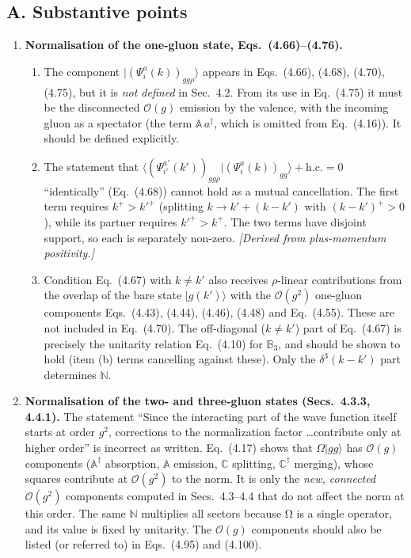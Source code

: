 \documentclass[11pt,a4paper]{article}
\newcommand{\eq}[1]{Eq.~(#1)}
\newcommand{\eqs}[1]{Eqs.~(#1)}
\begin{document}
\subsection*{A. Substantive points}

\begin{enumerate}[label=\textbf{A\arabic*.},leftmargin=26pt,itemsep=6pt]

\item \textbf{Normalisation of the one-gluon state, Eqs.~(4.66)--(4.76).}
\begin{enumerate}[label=(\alph*),itemsep=2pt]
\item The component $|(\Psi^a_i(k))_{gg\rho}\rangle$ appears in \eqs{4.66}, (4.68), (4.70), (4.75), but it is \emph{not defined} in Sec.~4.2. From its use in \eq{4.75} it must be the disconnected $\mathcal O(g)$ emission by the valence, with the incoming gluon as a spectator (the term $\mathbb A\,a^\dagger$, which is omitted from \eq{4.16}). It should be defined explicitly.
\item The statement that $\langle(\Psi^{a'}_{i'}(k'))_{gg\rho}|(\Psi^a_i(k))_{gg}\rangle+\text{h.c.}=0$ ``identically'' (\eq{4.68}) cannot hold as a mutual cancellation. The first term requires $k^+>k'^+$ (splitting $k\to k'+(k-k')$ with $(k-k')^+>0$), while its partner requires $k'^+>k^+$. The two terms have disjoint support, so each is separately non-zero. \emph{[Derived from plus-momentum positivity.]}
\item Condition \eq{4.67} with $k\neq k'$ also receives $\rho$-linear contributions from the overlap of the bare state $|g(k')\rangle$ with the $\mathcal O(g^2)$ one-gluon components \eqs{4.43}, (4.44), (4.46), (4.48) and \eq{4.55}. These are not included in \eq{4.70}. The off-diagonal ($k\neq k'$) part of \eq{4.67} is precisely the unitarity relation \eq{4.10} for $\mathbb B_3$, and should be shown to hold (item (b) terms cancelling against these). Only the $\delta^3(k-k')$ part determines $\mathbb N$.
\end{enumerate}

\item \textbf{Normalisation of the two- and three-gluon states (Secs.~4.3.3, 4.4.1).} The statement ``Since the interacting part of the wave function itself starts at order $g^2$, corrections to the normalization factor \dots contribute only at higher order'' is incorrect as written. \eq{4.17} shows that $\Omega|gg\rangle$ has $\mathcal O(g)$ components ($\mathbb A^\dagger$ absorption, $\mathbb A$ emission, $\mathbb C$ splitting, $\mathbb C^\dagger$ merging), whose squares contribute at $\mathcal O(g^2)$ to the norm. It is only the \emph{new, connected} $\mathcal O(g^2)$ components computed in Secs.~4.3--4.4 that do not affect the norm at this order. The same $\mathbb N$ multiplies all sectors because Ω is a single operator, and its value is fixed by unitarity. The $\mathcal O(g)$ components should also be listed (or referred to) in \eqs{4.95} and (4.100).


\end{enumerate}
\end{document}
